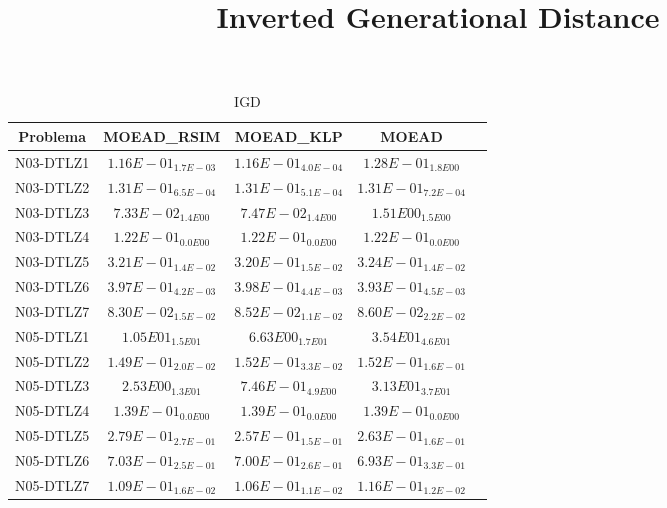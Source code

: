 \documentclass{article}
\title{Inverted Generational Distance}
\author{}
\begin{document}
\maketitle
\begin{table*}[ht!]
\scriptsize
\caption{IGD}
\centering\begin{tabular}{|c||c||c||c||c|} \hline
Problema &MOEAD_RSIM &MOEAD_KLP &MOEAD\\\hline
N03-DTLZ1 &\cellcolor{gray25}$1.16E-01_{1.7E-03}$ &\cellcolor{gray95}$1.16E-01_{4.0E-04}$ &$1.28E-01_{1.8E00}$\\ 
\hline
N03-DTLZ2 &\cellcolor{gray25}$1.31E-01_{6.5E-04}$ &\cellcolor{gray95}$1.31E-01_{5.1E-04}$ &$1.31E-01_{7.2E-04}$\\ 
\hline
N03-DTLZ3 &\cellcolor{gray95}$7.33E-02_{1.4E00}$ &\cellcolor{gray25}$7.47E-02_{1.4E00}$ &$1.51E00_{1.5E00}$\\ 
\hline
N03-DTLZ4 &\cellcolor{gray95}$1.22E-01_{0.0E00}$ &\cellcolor{gray25}$1.22E-01_{0.0E00}$ &$1.22E-01_{0.0E00}$\\ 
\hline
N03-DTLZ5 &\cellcolor{gray25}$3.21E-01_{1.4E-02}$ &\cellcolor{gray95}$3.20E-01_{1.5E-02}$ &$3.24E-01_{1.4E-02}$\\ 
\hline
N03-DTLZ6 &\cellcolor{gray25}$3.97E-01_{4.2E-03}$ &$3.98E-01_{4.4E-03}$ &\cellcolor{gray95}$3.93E-01_{4.5E-03}$\\ 
\hline
N03-DTLZ7 &\cellcolor{gray95}$8.30E-02_{1.5E-02}$ &\cellcolor{gray25}$8.52E-02_{1.1E-02}$ &$8.60E-02_{2.2E-02}$\\ 
\hline
N05-DTLZ1 &\cellcolor{gray25}$1.05E01_{1.5E01}$ &\cellcolor{gray95}$6.63E00_{1.7E01}$ &$3.54E01_{4.6E01}$\\ 
\hline
N05-DTLZ2 &\cellcolor{gray95}$1.49E-01_{2.0E-02}$ &\cellcolor{gray25}$1.52E-01_{3.3E-02}$ &$1.52E-01_{1.6E-01}$\\ 
\hline
N05-DTLZ3 &\cellcolor{gray25}$2.53E00_{1.3E01}$ &\cellcolor{gray95}$7.46E-01_{4.9E00}$ &$3.13E01_{3.7E01}$\\ 
\hline
N05-DTLZ4 &\cellcolor{gray95}$1.39E-01_{0.0E00}$ &\cellcolor{gray25}$1.39E-01_{0.0E00}$ &$1.39E-01_{0.0E00}$\\ 
\hline
N05-DTLZ5 &$2.79E-01_{2.7E-01}$ &\cellcolor{gray95}$2.57E-01_{1.5E-01}$ &\cellcolor{gray25}$2.63E-01_{1.6E-01}$\\ 
\hline
N05-DTLZ6 &$7.03E-01_{2.5E-01}$ &\cellcolor{gray25}$7.00E-01_{2.6E-01}$ &\cellcolor{gray95}$6.93E-01_{3.3E-01}$\\ 
\hline
N05-DTLZ7 &\cellcolor{gray25}$1.09E-01_{1.6E-02}$ &\cellcolor{gray95}$1.06E-01_{1.1E-02}$ &$1.16E-01_{1.2E-02}$\\ 

\end{tabular}
\end{table*}
\end{document}

